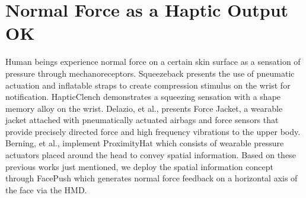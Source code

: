 \section{Normal Force as a Haptic Output OK}
Human beings experience normal force on a certain skin surface as a sensation of pressure through mechanoreceptors. Squeezeback \cite{Squeezback} presents the use of pneumatic actuation and inflatable straps to create compression stimulus on the wrist for notification. HapticClench \cite{HapticClench} demonstrates a squeezing sensation with a shape memory alloy on the wrist. Delazio, et al., \cite{forceJacket} presents Force Jacket, a wearable jacket attached with pneumatically actuated airbags and force sensors that provide precisely directed force and high frequency vibrations to the upper body. Berning, et al., \cite{ProximityHat} implement ProximityHat which consists of wearable pressure actuators placed around the head to convey spatial information. Based on these previous works just mentioned, we deploy the spatial information concept through FacePush which generates normal force feedback on a horizontal axis of the face via the HMD.


